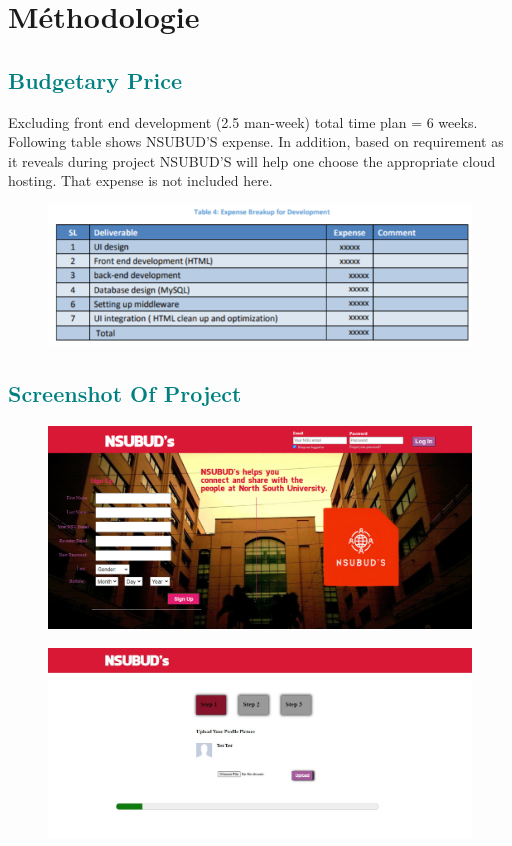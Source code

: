 \chapter{Méthodologie}


\newpage
{\textcolor{teal}{\section{Budgetary Price}}
Excluding front end development (2.5 man-week) total time plan = 6 weeks. Following table shows NSUBUD'S expense. In addition, based on requirement as it
reveals during project NSUBUD'S will help one choose the appropriate cloud hosting. That expense is not included here.
\begin{figure}[ht]
\includegraphics[width=18cm]{figures/table4.png}
\label{fig:graph}
\end{figure}
{\textcolor{teal}{\section{Screenshot Of Project}}
\begin{figure}[ht]
\includegraphics[width=18cm]{images/screenshot1.png}
\label{fig:graph}
\end{figure}
\newpage
\begin{figure}[ht]
\includegraphics[width=18cm]{images/signup1.png}

\end{figure}}}
